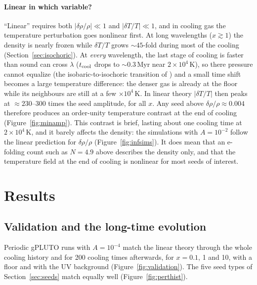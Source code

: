 \documentclass[11pt]{article}
\newcommand{\tcool}{t_{\rm cool}}
\newcommand{\drho}{\delta\rho/\rho}
\begin{document}
\paragraph{Linear in which variable?} ``Linear'' requires both $|\drho|\ll1$ and
$|\delta T/T|\ll1$, and in cooling gas the temperature perturbation goes nonlinear
first. At long wavelengths ($x\gtrsim1$) the density is nearly frozen while
$\delta T/T$ grows $\sim45$-fold during most of the cooling
(Section~\ref{sec:isochoric}). At \emph{every} wavelength, the last stage of cooling
is faster than sound can cross $\lambda$ ($\tcool$ drops to $\sim0.3$\,Myr near
$2\times10^4$\,K), so there pressure cannot equalize (the isobaric-to-isochoric
transition of \citealt{burkert00}) and a small time shift becomes
a large temperature difference: the denser gas is already at the floor while its
neighbours are still at a few $\times10^4$\,K. In linear theory $|\delta T/T|$ then
peaks at $\approx230$--300 times the seed amplitude, for all $x$. Any seed above
$\drho\approx0.004$ therefore produces an order-unity temperature contrast at the end
of cooling (Figure~\ref{fig:minamp}). This contrast is brief, lasting about one
cooling time at $2\times10^4$\,K, and it barely affects the density: the
simulations with $A=10^{-2}$ follow the linear prediction for $\drho$
(Figure~\ref{fig:infsims}). It does mean that an e-folding count such as $N=4.9$
above describes the density only, and that the temperature field at the end of
cooling is nonlinear for most seeds of interest.

\section{Results}
\label{sec:results}

\subsection{Validation and the long-time evolution}
\label{sec:validation}
Periodic gPLUTO runs with $A=10^{-4}$ match the linear theory through the whole
cooling history and for 200 cooling times afterwards, for $x=0.1$, 1 and 10, with
a floor and with the UV background (Figure~\ref{fig:validation}). The five seed
types of Section~\ref{sec:seeds} match equally well (Figure~\ref{fig:perthist}).
\end{document}
